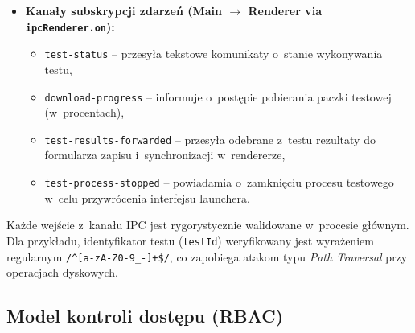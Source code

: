 \documentclass[12pt, a4paper, oneside]{report}
\begin{document}
\begin{itemize}
\begin{itemize}
		      \item \texttt{export-template} i~\texttt{import-template} – realizują operacje eksportu/importu szablonów ankiet demograficznych w~formacie JSON,
		      \item \texttt{download-bulk-zip} – generuje paczkę ZIP z~wybranymi rezultatami badań i~zapisuje ją w~wybranej przez użytkownika lokalizacji.
	      \end{itemize}
	\item \textbf{Kanały subskrypcji zdarzeń (Main $\rightarrow$ Renderer via \texttt{ipcRenderer.on}):}
	      \begin{itemize}
		      \item \texttt{test-status} – przesyła tekstowe komunikaty o~stanie wykonywania testu,
		      \item \texttt{download-progress} – informuje o~postępie pobierania paczki testowej (w~procentach),
		      \item \texttt{test-results-forwarded} – przesyła odebrane z~testu rezultaty do formularza zapisu i~synchronizacji w~rendererze,
		      \item \texttt{test-process-stopped} – powiadamia o~zamknięciu procesu testowego w~celu przywrócenia interfejsu launchera.
	      \end{itemize}
\end{itemize}

Każde wejście z~kanału IPC jest rygorystycznie walidowane w~procesie głównym. Dla przykładu, identyfikator testu (\texttt{testId}) weryfikowany jest wyrażeniem regularnym \lstinline|/^[a-zA-Z0-9_-]+$/|, co zapobiega atakom typu \textit{Path Traversal} przy operacjach dyskowych.

\subsection{Model kontroli dostępu (RBAC)}
\label{subsec:rbac}
\end{document}
